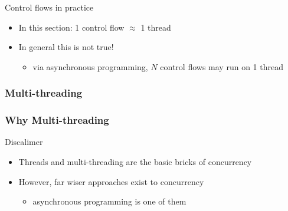 \documentclass[presentation]{beamer}\mode<presentation>{\usetheme{AMSBolognaFC}}
\begin{document}
\begin{frame}[allowframebreaks]
    \begin{exampleblock}{Control flows in practice}
        \begin{itemize}
            \item In this section: 1 control flow $\approx$ 1 thread
            \item In general this is not true!
            \begin{itemize}
                \item via \alert{asynchronous programming}, $N$ control flows may run on 1 thread
            \end{itemize}
        \end{itemize}
    \end{exampleblock}
\end{frame}

\subsubsection{Multi-threading}

\begin{frame}
    \frametitle{Why Multi-threading}

    \begin{alertblock}{Discalimer}
        \begin{itemize}
            \item \alert{Threads} and \alert{multi-threading}  are the basic bricks of concurrency

            \item However, far wiser approaches exist to concurrency
            \begin{itemize}
                \item \alert{asynchronous programming} is one of them
            \end{itemize}
        \end{itemize}
    \end{alertblock}

\end{frame}
\end{document}
